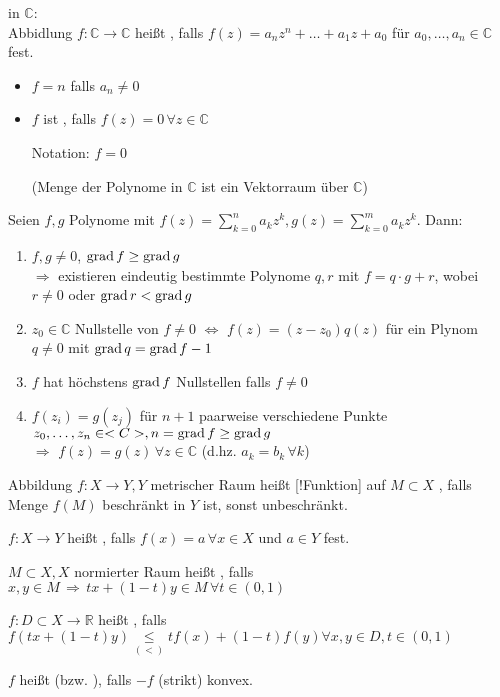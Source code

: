 \begin{example}
	 in $\mathbb{C}$:\\
	Abbidlung $f:\mathbb{C}\rightarrow\mathbb{C}$ heißt , falls $f(z) = a_n z^n + \dotsc + a_1 z + a_0$ für $a_0,\dotsc, a_n\in\mathbb{C}$ fest.
	\begin{itemize}
		\item {}$f = n$ falls $a_n\neq 0$
		\item $f$ ist , falls $f(z) = 0\,\forall z\in\mathbb{C}$
		
		Notation: $f=0$
		
		(Menge der Polynome in $\mathbb{C}$ ist ein Vektorraum über $\mathbb{C}$)
	\end{itemize}
\end{example}
\begin{proposition}\label{Polynomdiv}
	Seien $f,g$ Polynome mit $f(z) = \sum_{k=0}^n a_k z^k, g(z) = \sum_{k=0}^m a_k z^k$. Dann:
	\begin{enumerate}[label={\arabic*)}]
		\item $f,g\neq 0$, $\operatorname{grad} f\ge \operatorname{grad} g$\\
		$\Rightarrow$ existieren eindeutig bestimmte Polynome $q,r$ mit $f = q\cdot g + r$, wobei $r\neq 0$ oder $\operatorname{grad} r < \operatorname{grad} g$
		\item $z_0\in\mathbb{C}$ Nullstelle von $f\neq 0$ $\Leftrightarrow$ $f(z) = (z - z_0)q(z)$ für ein Plynom $q\neq 0$ mit $\operatorname{grad} q = \operatorname{grad} f -1$
		\item $f$ hat höchstens $\operatorname{grad} f$ Nullstellen falls $f\neq 0$
		\item $f(z_i) = g(z_j)$ für $n+1$ paarweise verschiedene Punkte $z_0, \dotsc, z_n\in<C>, n = \operatorname{grad} f \ge \operatorname{grad} g$\\
		$\Rightarrow$ $f(z) = g(z) \,\forall z\in\mathbb{C}$ (d.hz. $a_k = b_k\,\forall k$)
	\end{enumerate}
\end{proposition}
\begin{*definition}
	Abbildung $f:X\rightarrow Y, Y$ metrischer Raum heißt [!Funktion] auf $M\subset X$ , falls Menge $f(M)$ beschränkt in $Y$ ist, sonst unbeschränkt.
\end{*definition}
\begin{*definition}
	$f:X\to Y$ heißt , falls $f(x) = a\,\forall x\in X$ und $a\in Y$ fest.
\end{*definition}
\begin{*definition}
	$M\subset X, X$ normierter Raum heißt , falls $x,y\in M \,\Rightarrow \,tx+(1-t)y \in M\,\forall t\in(0,1)$
	
	$f:D\subset X\to \mathbb{R}$ heißt , falls $f(tx + (1-t)y) \underset{(<)}{\le} t f(x) + (1-t)f(y)\forall x,y\in D, t\in(0,1)$
	
	$f$ heißt  (bzw. ), falls $-f$ (strikt) konvex.
\end{*definition}


